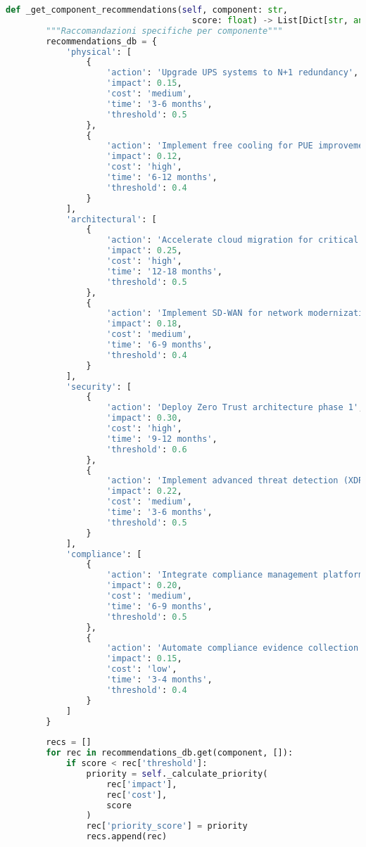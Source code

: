 \begin{lstlisting}[language=Python, caption=Classe GISTFramework Completa]
    def _get_component_recommendations(self, component: str, 
                                     score: float) -> List[Dict[str, any]]:
        """Raccomandazioni specifiche per componente"""
        recommendations_db = {
            'physical': [
                {
                    'action': 'Upgrade UPS systems to N+1 redundancy',
                    'impact': 0.15,
                    'cost': 'medium',
                    'time': '3-6 months',
                    'threshold': 0.5
                },
                {
                    'action': 'Implement free cooling for PUE improvement',
                    'impact': 0.12,
                    'cost': 'high',
                    'time': '6-12 months',
                    'threshold': 0.4
                }
            ],
            'architectural': [
                {
                    'action': 'Accelerate cloud migration for critical workloads',
                    'impact': 0.25,
                    'cost': 'high',
                    'time': '12-18 months',
                    'threshold': 0.5
                },
                {
                    'action': 'Implement SD-WAN for network modernization',
                    'impact': 0.18,
                    'cost': 'medium',
                    'time': '6-9 months',
                    'threshold': 0.4
                }
            ],
            'security': [
                {
                    'action': 'Deploy Zero Trust architecture phase 1',
                    'impact': 0.30,
                    'cost': 'high',
                    'time': '9-12 months',
                    'threshold': 0.6
                },
                {
                    'action': 'Implement advanced threat detection (XDR)',
                    'impact': 0.22,
                    'cost': 'medium',
                    'time': '3-6 months',
                    'threshold': 0.5
                }
            ],
            'compliance': [
                {
                    'action': 'Integrate compliance management platform',
                    'impact': 0.20,
                    'cost': 'medium',
                    'time': '6-9 months',
                    'threshold': 0.5
                },
                {
                    'action': 'Automate compliance evidence collection',
                    'impact': 0.15,
                    'cost': 'low',
                    'time': '3-4 months',
                    'threshold': 0.4
                }
            ]
        }
        
        recs = []
        for rec in recommendations_db.get(component, []):
            if score < rec['threshold']:
                priority = self._calculate_priority(
                    rec['impact'], 
                    rec['cost'], 
                    score
                )
                rec['priority_score'] = priority
                recs.append(rec)
        

\end{lstlisting}
